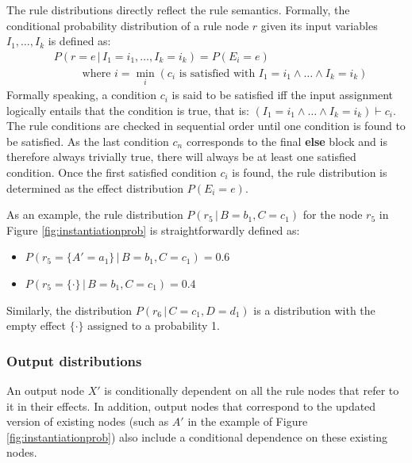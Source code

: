 The rule distributions directly reflect the rule semantics.  Formally, the conditional probability distribution of a rule node $r$ given its input variables $I_1, \dots, I_k$ is defined as: 
\begin{align}
& P(r\!=\!e \, | \, I_1\!=\!i_1, \dots, I_k\!=\!i_k) = P(E_i = e) \label{eq:ruledistrib}
 \\ 
& \; \; \; \; \; \; \; \; \text{ where } i = \min_i (c_i \text{ is satisfied with } I_1\!=\!i_1 \land \dots \land I_k\!=\!i_k) \nonumber 
\end{align}
Formally speaking, a condition $c_i$ is said to be satisfied iff the input assignment logically entails that the condition is true, that is: $(I_1\!=\!i_1 \land \dots \land I_k\!=\!i_k) \vdash c_i$. The rule conditions are checked in sequential order until one condition is found to be satisfied. As the last condition $c_n$ corresponds to the final \textbf{else} block and is therefore always trivially true, there will always be at least one satisfied condition. Once the first satisfied condition $c_i$ is found, the rule distribution is determined as the effect distribution $P(E_i\!=\!e)$.

As an example, the rule distribution $P(r_5 \, | \, B\!=\!b_1, C\!=\!c_1)$ for the node $r_5$ in Figure \ref{fig:instantiationprob} is straightforwardly defined as:
\begin{itemize}
\item $P(r_5 = \{A'\!=\!a_1\} \, | \, B\!=\!b_1, C\!=\!c_1) = 0.6$
\item  $P(r_5 = \{\cdot\} \, | \, B\!=\!b_1, C\!=\!c_1) = 0.4$
\end{itemize}

Similarly, the distribution $P(r_6 \, | \, C\!=\!c_1, D\!=\!d_1)$ is a distribution with the empty effect $\{\cdot\}$ assigned to a probability 1. 

\subsubsection*{Output distributions} 

An output node $X'$ is conditionally dependent on all the rule nodes that refer to it in their effects.  In addition, output nodes that correspond to the updated version of existing nodes (such as $A'$ in the example of Figure \ref{fig:instantiationprob}) also include a conditional dependence on these existing nodes.

